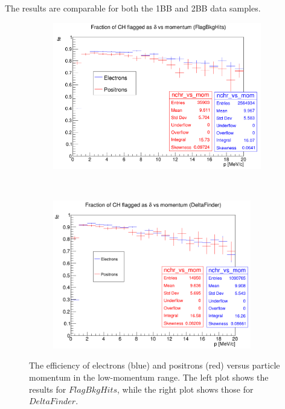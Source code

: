 The results are comparable for both the 1BB and 2BB data samples.


    \begin{figure}[!h]
        \centering
        \begin{subfigure}[t]{0.5\textwidth}
            \centering
            \includegraphics[width=1.\textwidth]{figures/png/Screenshot_20240818_155835.png}
            \caption{}
            \label{fig:eff1}
        \end{subfigure}%
        ~ 
        \begin{subfigure}[t]{0.5\textwidth}
            \centering
            \includegraphics[width=0.95\textwidth]{figures/png/Screenshot_20240813_203916.png}
            \caption{}
            \label{fig:eff2}
        \end{subfigure}
        \caption[The efficiency of electrons and positrons versus 
        particle momentum in the low-momentum range.]{The efficiency of electrons (blue) and positrons (red) versus 
        particle momentum in the low-momentum range. The left plot shows the 
        results for $FlagBkgHits$, while the right plot shows those for $DeltaFinder$.
        }
        \label{fig:efficiency}
      \end{figure} 


